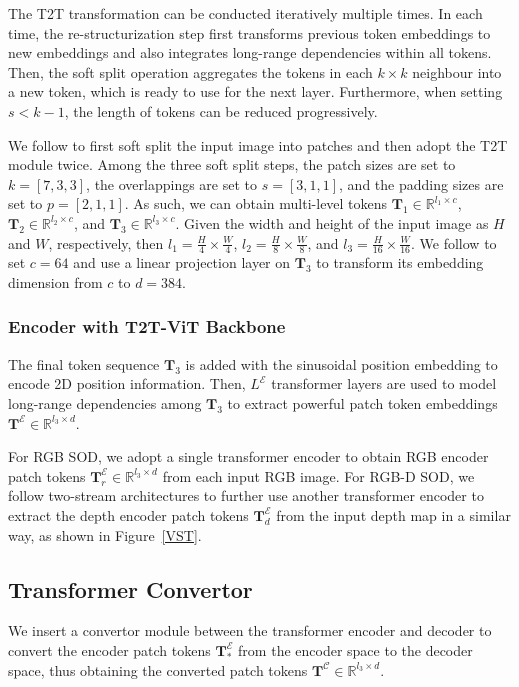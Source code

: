 \documentclass[10pt,twocolumn,letterpaper]{article}
\begin{document}
The T2T transformation can be conducted iteratively multiple times. In each time, the re-structurization step first transforms previous token embeddings to new embeddings and also integrates long-range dependencies within all tokens. Then, the soft split operation aggregates the tokens in each $k\times k$ neighbour into a new token, which is ready to use for the next layer. Furthermore, when setting $s<k-1$, the length of tokens can be reduced progressively.

We follow \cite{yuan2021tokens} to first soft split the input image into patches and then adopt the T2T module twice. Among the three soft split steps, the patch sizes are set to $k = [7, 3, 3]$, the overlappings are set to $s = [3, 1, 1]$, and the padding sizes are set to $p = [2, 1, 1]$.
As such, we can obtain multi-level tokens $\bm{T}_1 \in {\mathbb{R}^{l_1\times c}}$, $\bm{T}_2 \in {\mathbb{R}^{l_2\times c}}$, and $\bm{T}_3 \in {\mathbb{R}^{l_3\times c}}$.
Given the width and height of the input image as $H$ and $W$, respectively, then $l_1 = \frac{H}{4} \times \frac{W}{4}$, $l_2 = \frac{H}{8} \times \frac{W}{8}$, and $l_3 = \frac{H}{16} \times \frac{W}{16}$. We follow \cite{yuan2021tokens} to set $c=64$ and use a linear projection layer on $\bm{T}_3$ to transform its embedding dimension from $c$ to $d=384$.
\vspace{-3mm}
\subsubsection{Encoder with T2T-ViT Backbone}
The final token sequence $\bm{T}_3$ is added with the sinusoidal position embedding \cite{vaswani2017attention} to encode 2D position information. Then, $L^{\mathcal{E}}$ transformer layers are used to model long-range dependencies among $\bm{T}_3$ to extract powerful patch token embeddings $\bm{T}^{\mathcal{E}} \in {\mathbb{R}^{l_3\times d}}$.

For RGB SOD, we adopt a single transformer encoder to obtain RGB encoder patch tokens $\bm{T}_r^{\mathcal{E}} \in {\mathbb{R}^{l_3\times d}}$ from each input RGB image. For RGB-D SOD, we follow two-stream architectures to further use another transformer encoder to extract the depth encoder patch tokens $\bm{T}_d^{\mathcal{E}}$ from the input depth map in a similar way, as shown in Figure~\ref{VST}.


\subsection{Transformer Convertor}
We insert a convertor module between the transformer encoder and decoder to convert the encoder patch tokens $\bm{T}_*^{\mathcal{E}}$ from the encoder space to the decoder space, thus obtaining the converted patch tokens $\bm{T}^{\mathcal{C}} \in {\mathbb{R}^{l_3 \times d}}$.
\vspace{-3mm}
\end{document}
